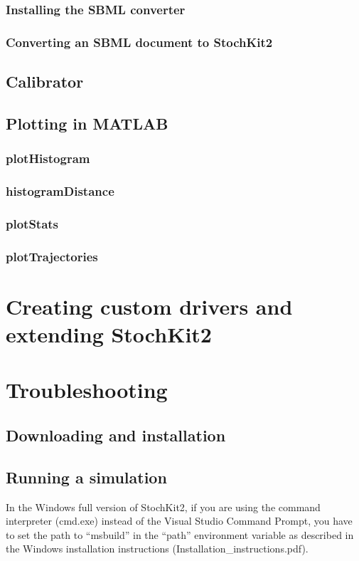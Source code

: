 \documentclass[11pt,letterpaper]{article}
\begin{document}
\subsubsection{Installing the SBML converter}
\subsubsection{Converting an SBML document to StochKit2}
\subsection{Calibrator}
\subsection{Plotting in MATLAB}
\subsubsection{plotHistogram}
\subsubsection{histogramDistance}
\subsubsection{plotStats}
\subsubsection{plotTrajectories}

\section{Creating custom drivers and extending StochKit2}

\section{Troubleshooting}
\subsection{Downloading and installation}
\subsection{Running a simulation}

In the Windows full version of StochKit2, if you are using the command interpreter (cmd.exe) instead of the Visual Studio Command Prompt, you have to set the path to ``msbuild'' in the ``path'' environment variable as described in the Windows installation instructions (Installation\_instructions.pdf).
\end{document}
